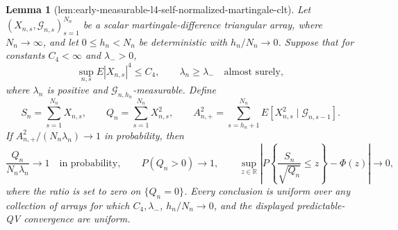 \documentclass{article}
\newtheorem{lemma}{Lemma}
\begin{document}
\begin{lemma}[lem:early-measurable-l4-self-normalized-martingale-clt]\label{lem:early-measurable-l4-self-normalized-martingale-clt}
Let \((X_{n,s},\mathcal G_{n,s})_{s=1}^{N_n}\) be a scalar martingale-difference triangular array, where \(N_n\to\infty\), and let \(0\le h_n<N_n\) be deterministic with \(h_n/N_n\to0\).  Suppose that for constants \(C_4<\infty\) and \(\lambda_->0\),
\[
\sup_{n,s}E|X_{n,s}|^4\le C_4,\qquad
\lambda_n\ge\lambda_-\quad\text{almost surely},
\]
where \(\lambda_n\) is positive and \(\mathcal G_{n,h_n}\)-measurable.  Define
\[
S_n=\sum_{s=1}^{N_n}X_{n,s},\qquad
Q_n=\sum_{s=1}^{N_n}X_{n,s}^2,\qquad
A_{n,+}^2=\sum_{s=h_n+1}^{N_n}E[X_{n,s}^2\mid\mathcal G_{n,s-1}].
\]
If \(A_{n,+}^2/(N_n\lambda_n)\to1\) in probability, then
\[
\frac{Q_n}{N_n\lambda_n}\longrightarrow1\quad\text{in probability},\qquad
P(Q_n>0)\longrightarrow1,\qquad
\sup_{z\in\mathbb R}\left|P\left\{\frac{S_n}{\sqrt{Q_n}}\le z\right\}-\Phi(z)\right|\longrightarrow0,
\]
where the ratio is set to zero on \(\{Q_n=0\}\).  Every conclusion is uniform over any collection of arrays for which \(C_4,\lambda_-\), \(h_n/N_n\to0\), and the displayed predictable-QV convergence are uniform.
\end{lemma}
\end{document}

